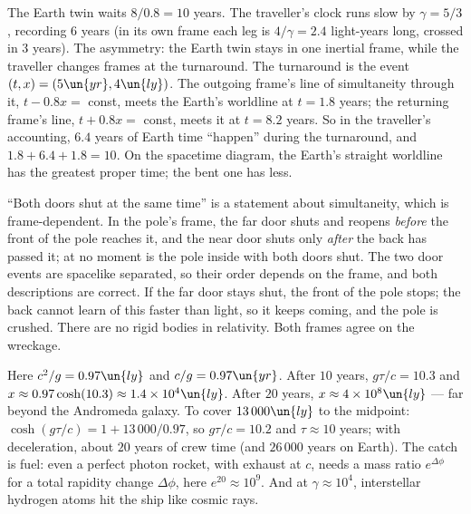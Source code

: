  The Earth twin waits $8/0.8 = 10$ years. The traveller's clock runs slow by $\gamma = 5/3$, recording $6$ years (in its own frame each leg is $4/\gamma = 2.4$ light-years long, crossed in $3$ years). The asymmetry: the Earth twin stays in one inertial frame, while the traveller changes frames at the turnaround. The turnaround is the event $(t,x) = (5\un{yr}, 4\un{ly})$. The outgoing frame's line of simultaneity through it, $t - 0.8x = $ const, meets the Earth's worldline at $t = 1.8$ years; the returning frame's line, $t + 0.8x = $ const, meets it at $t = 8.2$ years. So in the traveller's accounting, $6.4$ years of Earth time ``happen'' during the turnaround, and $1.8 + 6.4 + 1.8 = 10$. On the spacetime diagram, the Earth's straight worldline has the greatest proper time; the bent one has less.

 ``Both doors shut at the same time'' is a statement about simultaneity, which is frame-dependent. In the pole's frame, the far door shuts and reopens \emph{before} the front of the pole reaches it, and the near door shuts only \emph{after} the back has passed it; at no moment is the pole inside with both doors shut. The two door events are spacelike separated, so their order depends on the frame, and both descriptions are correct. If the far door stays shut, the front of the pole stops; the back cannot learn of this faster than light, so it keeps coming, and the pole is crushed. There are no rigid bodies in relativity. Both frames agree on the wreckage.

 Here $c^2/g = 0.97\un{ly}$ and $c/g = 0.97\un{yr}$. After $10$ years, $g\tau/c = 10.3$ and $x\approx0.97\cosh(10.3)\approx1.4\times10^4\un{ly}$. After $20$ years, $x\approx4\times10^8\un{ly}$ --- far beyond the Andromeda galaxy. To cover $13\,000\un{ly}$ to the midpoint: $\cosh(g\tau/c) = 1 + 13\,000/0.97$, so $g\tau/c = 10.2$ and $\tau\approx10$ years; with deceleration, about $20$ years of crew time (and $26\,000$ years on Earth). The catch is fuel: even a perfect photon rocket, with exhaust at $c$, needs a mass ratio $e^{\Delta\phi}$ for a total rapidity change $\Delta\phi$, here $e^{20}\approx10^9$. And at $\gamma\approx10^4$, interstellar hydrogen atoms hit the ship like cosmic rays.

